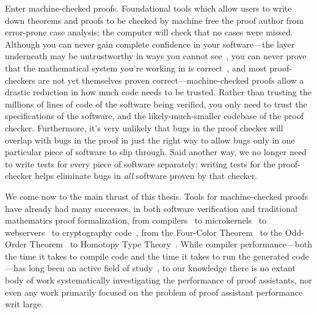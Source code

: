 Enter machine-checked proofs.
Foundational tools which allow users to write down theorems and proofs to be checked by machine free the proof author from error-prone case analysis; the computer will check that no cases were missed.
Although you can never gain complete confidence in your software---the layer underneath may be untrustworthy in ways you cannot see~\cite{Reflections1984Thompson}, you can never prove that the mathematical system you're working in is correct~\cite{sep-goedel-incompleteness}, and most proof-checkers are not yet themselves proven correct---machine-checked proofs allow a drastic reduction in how much code needs to be trusted.
Rather than trusting the millions of lines of code of the software being verified, you only need to trust the specifications of the software, and the likely-much-smaller codebase of the proof checker.
Furthermore, it's very unlikely that bugs in the proof checker will overlap with bugs in the proof in just the right way to allow bugs only in one particular piece of software to slip through.
Said another way, we no longer need to write tests for every piece of software separately; writing tests for the proof-checker helps eliminate bugs in \emph{all} software proven by that checker.

We come now to the main thrust of this thesis.
Tools for machine-checked proofs have already had many successes, in both software verification and traditional mathematics proof formalization, from compilers~\cite{Compcert} to microkernels~\cite{seL4SOSP09} to webservers~\cite{Network2015Chlipala} to cryptography code~\cite{FiatCryptoSP19}, from the Four-Color Theorem~\cite{gonthier2008formal} to the Odd-Order Theorem~\cite{gonthier2013machine} to Homotopy Type Theory~\cite{HoTTBook}.
While compiler performance---both the time it takes to compile code and the time it takes to run the generated code---has long been an active field of study~\cite{CC++Performance2017}, to our knowledge there is no extant body of work systematically investigating the performance of proof assistants, nor even any work primarily focused on the problem of proof assistant performance writ large.

